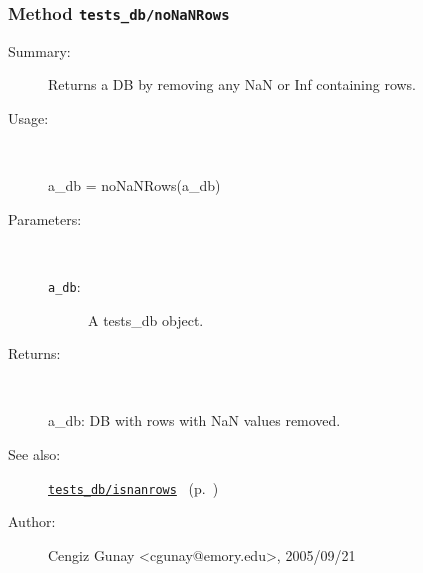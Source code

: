 \subsubsection[Method \texttt{noNaNRows}]{Method \texttt{tests\_db/noNaNRows}}%
%
\label{ref_tests_db__noNaNRows}%
\hypertarget{ref_tests_db__noNaNRows}{}%
\begin{description}
\item[Summary:]Returns a DB by removing any NaN or Inf containing rows.
%
\item[Usage:]~%
\begin{lyxcode}%
a\_db = noNaNRows(a\_db)
%
\end{lyxcode}%
%
%
\item[Parameters:]~
\begin{description}%
\item[\texttt{a\_db}:]
 A tests\_db object.
\end{description}%
%
\item[Returns:]~

	a\_db: DB with rows with NaN values removed.
%
%
\item[See also:]%
\hyperlink{ref_tests_db__isnanrows}{\texttt{tests\_db/isnanrows}}%
\ (p.~\pageref{ref_tests_db__isnanrows})%
%
%
\item[Author:]%
Cengiz Gunay <cgunay@emory.edu>, 2005/09/21%
\end{description}
\methodline%
